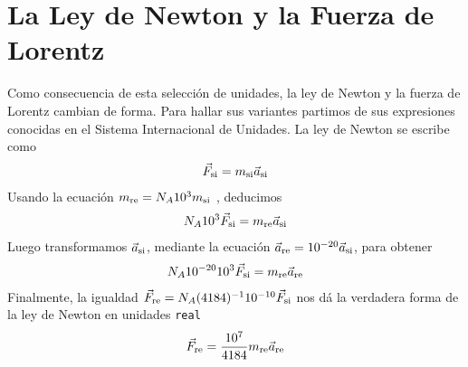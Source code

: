 \documentclass{article}
\newcommand{\internationalUnitSystem}{\textnormal{si}}
\newcommand{\realUnitSystem}{\textnormal{re}}
\begin{document}
  \section{La Ley de Newton y la Fuerza de Lorentz}
  Como consecuencia de esta selección de unidades, la ley de Newton y la fuerza de Lorentz cambian de forma.
  Para hallar sus variantes partimos de sus expresiones conocidas en el Sistema Internacional de Unidades.
  La ley de Newton se escribe como
  \begin{align}
    \vec{F}_{\internationalUnitSystem} = m_{\internationalUnitSystem} \vec{a}_{\internationalUnitSystem}
  \end{align}
  Usando la ecuación
  \(
    m_{\realUnitSystem} = N_A 10^3 m_{\internationalUnitSystem}
  \)
  , deducimos
  \begin{align}
    N_A 10^3 \vec{F}_{\internationalUnitSystem}
    =
    m_{\realUnitSystem} \vec{a}_{\internationalUnitSystem}
  \end{align}
  Luego transformamos \(\vec{a}_{\internationalUnitSystem}\), mediante la ecuación
  \(
    \vec{a}_{\realUnitSystem} = 10^{- 20} \vec{a}_{\internationalUnitSystem}
  \),
  para obtener
  \begin{align}
    N_A 10^{- 20} 10^3 \vec{F}_{\internationalUnitSystem}
    =
    m_{\realUnitSystem} \vec{a}_{\realUnitSystem}
  \end{align}
  Finalmente, la igualdad \(\vec{F}_{\realUnitSystem} = N_A (4184)^{-1} 10^{- 10} \vec{F}_{\internationalUnitSystem}\) nos dá la verdadera forma de la ley de Newton en unidades \texttt{real}
  \begin{align}
    \vec{F}_{\realUnitSystem}
    =
    \frac{10^7}{4184} m_{\realUnitSystem} \vec{a}_{\realUnitSystem}
  \end{align}
\end{document}
